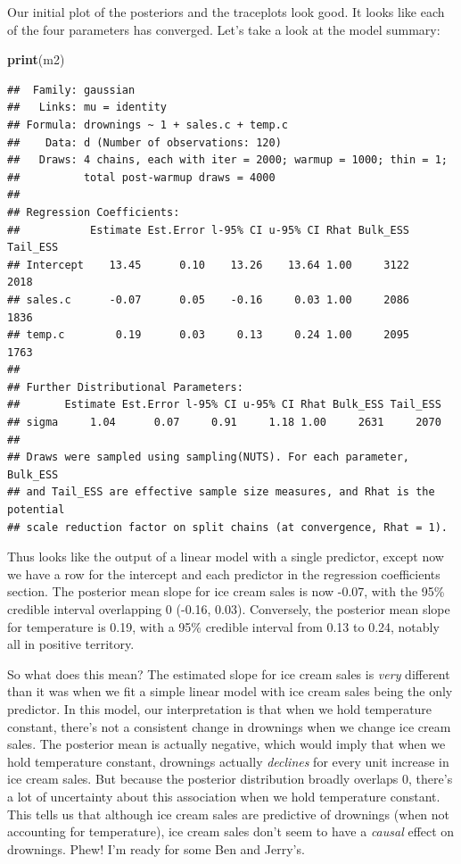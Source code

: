 \documentclass[
]{book}
\newenvironment{Shaded}{\begin{snugshade}}{\end{snugshade}}
\newcommand{\FunctionTok}[1]{\textcolor[rgb]{0.13,0.29,0.53}{\textbf{#1}}}
\newcommand{\NormalTok}[1]{#1}
\begin{document}
Our initial plot of the posteriors and the traceplots look good. It looks like each of the four parameters has converged. Let's take a look at the model summary:

\begin{Shaded}
\begin{Highlighting}[]
\FunctionTok{print}\NormalTok{(m2)}
\end{Highlighting}
\end{Shaded}

\begin{verbatim}
##  Family: gaussian 
##   Links: mu = identity 
## Formula: drownings ~ 1 + sales.c + temp.c 
##    Data: d (Number of observations: 120) 
##   Draws: 4 chains, each with iter = 2000; warmup = 1000; thin = 1;
##          total post-warmup draws = 4000
## 
## Regression Coefficients:
##           Estimate Est.Error l-95% CI u-95% CI Rhat Bulk_ESS Tail_ESS
## Intercept    13.45      0.10    13.26    13.64 1.00     3122     2018
## sales.c      -0.07      0.05    -0.16     0.03 1.00     2086     1836
## temp.c        0.19      0.03     0.13     0.24 1.00     2095     1763
## 
## Further Distributional Parameters:
##       Estimate Est.Error l-95% CI u-95% CI Rhat Bulk_ESS Tail_ESS
## sigma     1.04      0.07     0.91     1.18 1.00     2631     2070
## 
## Draws were sampled using sampling(NUTS). For each parameter, Bulk_ESS
## and Tail_ESS are effective sample size measures, and Rhat is the potential
## scale reduction factor on split chains (at convergence, Rhat = 1).
\end{verbatim}

Thus looks like the output of a linear model with a single predictor, except now we have a row for the intercept and each predictor in the regression coefficients section. The posterior mean slope for ice cream sales is now -0.07, with the 95\% credible interval overlapping 0 (-0.16, 0.03). Conversely, the posterior mean slope for temperature is 0.19, with a 95\% credible interval from 0.13 to 0.24, notably all in positive territory.

So what does this mean? The estimated slope for ice cream sales is \emph{very} different than it was when we fit a simple linear model with ice cream sales being the only predictor. In this model, our interpretation is that when we hold temperature constant, there's not a consistent change in drownings when we change ice cream sales. The posterior mean is actually negative, which would imply that when we hold temperature constant, drownings actually \emph{declines} for every unit increase in ice cream sales. But because the posterior distribution broadly overlaps 0, there's a lot of uncertainty about this association when we hold temperature constant. This tells us that although ice cream sales are predictive of drownings (when not accounting for temperature), ice cream sales don't seem to have a \emph{causal} effect on drownings. Phew! I'm ready for some Ben and Jerry's.
\end{document}
